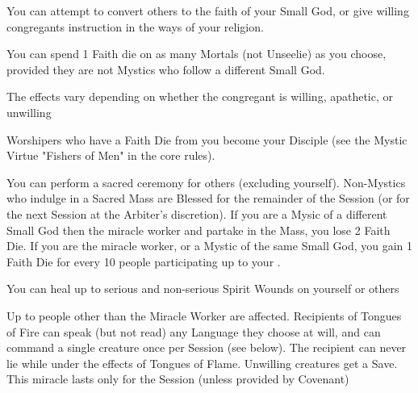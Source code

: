 {You can attempt to convert others to the faith of your Small God, or give willing congregants instruction in the ways of your religion.  

You can spend 1 Faith die on as many Mortals (not Unseelie) as you choose, provided they are not Mystics who follow a different Small God.

The effects vary depending on whether the congregant is willing, apathetic, or unwilling


Worshipers who have a Faith Die from you become your Disciple (see the Mystic Virtue "Fishers of Men" in the core rules).


You can perform a sacred ceremony for \SUMDICE others (excluding yourself).  Non-Mystics who indulge in a Sacred Mass are Blessed for the remainder of the Session (or for the next Session at the Arbiter's discretion).  If you are a Mysic of a different Small God then the miracle worker and partake in the Mass, you lose 2 Faith Die.  If you are the miracle worker, or a Mystic of the same Small God, you gain 1 Faith Die for every 10 people participating up to your \MAX.




You can heal up to \DICE serious and non-serious Spirit Wounds on yourself or others

\cbreak


Up to \SUMDICE people other than the Miracle Worker are affected.  Recipients of Tongues of Fire can speak (but not read) any Language they choose at will, and can command a single creature once per Session (see below).  The recipient can never lie while under the effects of Tongues of Flame.  Unwilling creatures get a Save.  This miracle lasts only for the Session (unless provided by Covenant)


}
